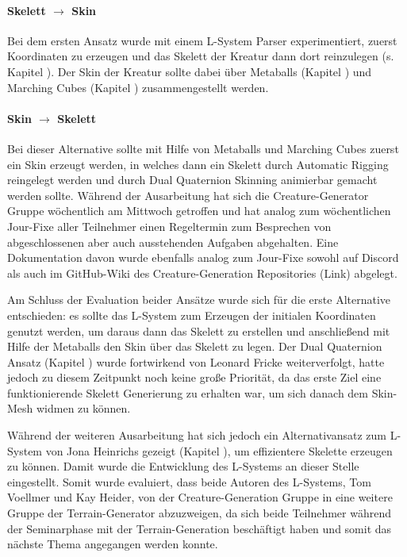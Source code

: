 \paragraph{Skelett $\rightarrow$ Skin} Bei dem ersten Ansatz wurde mit einem L-System Parser experimentiert, zuerst Koordinaten zu erzeugen und das Skelett der Kreatur dann dort reinzulegen (s. Kapitel ). Der Skin der Kreatur sollte dabei über Metaballs (Kapitel ) und Marching Cubes (Kapitel ) zusammengestellt werden.

\paragraph{Skin $\rightarrow$ Skelett} Bei dieser Alternative sollte mit Hilfe von Metaballs und Marching Cubes zuerst ein Skin erzeugt werden, in welches dann ein Skelett durch Automatic Rigging reingelegt werden und durch Dual Quaternion Skinning animierbar gemacht werden sollte.
\newline \newline
Während der Ausarbeitung hat sich die Creature-Generator Gruppe wöchentlich am Mittwoch getroffen und hat analog zum wöchentlichen Jour-Fixe aller Teilnehmer einen Regeltermin zum Besprechen von abgeschlossenen aber auch ausstehenden Aufgaben abgehalten. Eine Dokumentation davon wurde ebenfalls analog zum Jour-Fixe sowohl auf Discord als auch im GitHub-Wiki des Creature-Generation Repositories (Link) abgelegt.

Am Schluss der Evaluation beider Ansätze wurde sich für die erste Alternative entschieden: es sollte das L-System zum Erzeugen der initialen Koordinaten genutzt werden, um daraus dann das Skelett zu erstellen und anschließend mit Hilfe der Metaballs den Skin über das Skelett zu legen. Der Dual Quaternion Ansatz (Kapitel ) wurde fortwirkend von Leonard Fricke weiterverfolgt, hatte jedoch zu diesem Zeitpunkt noch keine große Priorität, da das erste Ziel eine funktionierende Skelett Generierung zu erhalten war, um sich danach dem Skin-Mesh widmen zu können.  

Während der weiteren Ausarbeitung hat sich jedoch ein Alternativansatz zum L-System von Jona Heinrichs gezeigt (Kapitel ), um effizientere Skelette erzeugen zu können. Damit wurde die Entwicklung des L-Systems an dieser Stelle eingestellt. Somit wurde evaluiert, dass beide Autoren des L-Systems, Tom Voellmer und Kay Heider, von der Creature-Generation Gruppe in eine weitere Gruppe der Terrain-Generator abzuzweigen, da sich beide Teilnehmer während der Seminarphase mit der Terrain-Generation beschäftigt haben und somit das nächste Thema angegangen werden konnte.

